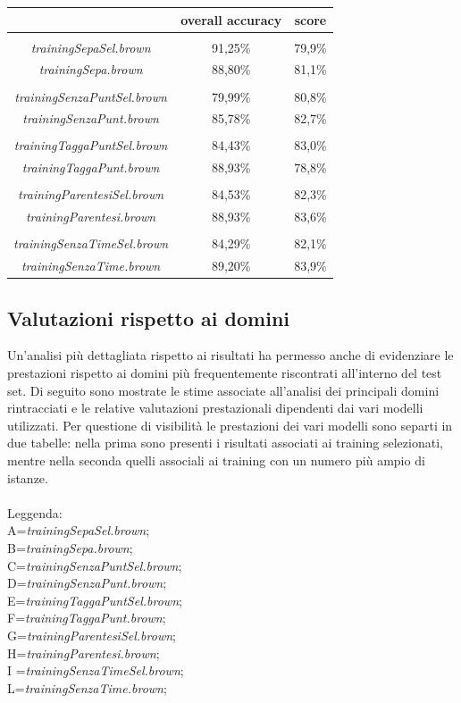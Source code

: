 \documentclass[a4paper]{report}
\begin{document}
\begin{center}
\begin{tabular}{|ccc|}
\hline
 & \textbf{overall accuracy} & \textbf{score}\\
\hline
 & &  \\
\hline
\textit{trainingSepaSel.brown} & 91,25\% & 79,9\% \\
\textit{trainingSepa.brown} & 88,80\% & 81,1\% \\
\hline
 & &  \\
\hline
\textit{trainingSenzaPuntSel.brown} & 79,99\% & 80,8\% \\
\textit{trainingSenzaPunt.brown} & 85,78\% & 82,7\% \\
\hline
 & &  \\
\hline
\textit{trainingTaggaPuntSel.brown} & 84,43\% & 83,0\% \\
\textit{trainingTaggaPunt.brown} & 88,93\% & 78,8\% \\
\hline
 & &  \\
\hline
\textit{trainingParentesiSel.brown} & 84,53\% &  82,3\% \\
\textit{trainingParentesi.brown} & 88,93\% & 83,6\% \\
\hline
 & &  \\
\hline
\textit{trainingSenzaTimeSel.brown} & 84,29\% & 82,1\% \\
\textit{trainingSenzaTime.brown} & 89,20\% & 83,9\% \\
\hline
\end{tabular}
\end{center}
\subsection{Valutazioni rispetto ai domini}
Un'analisi più dettagliata rispetto ai risultati ha permesso anche di evidenziare le prestazioni rispetto ai domini più frequentemente riscontrati all'interno del test set. Di seguito sono mostrate le stime associate all'analisi dei principali domini rintracciati e le relative valutazioni prestazionali dipendenti dai vari modelli utilizzati. Per questione di visibilità le prestazioni dei vari modelli sono separti in due tabelle: nella prima sono presenti i risultati associati ai training selezionati, mentre nella seconda quelli associali ai training con un numero più ampio di istanze.\\ \\
Leggenda:\\
A=\textit{trainingSepaSel.brown};\\
B=\textit{trainingSepa.brown}; \\
C=\textit{trainingSenzaPuntSel.brown}; \\
D=\textit{trainingSenzaPunt.brown}; \\
E=\textit{trainingTaggaPuntSel.brown};\\
F=\textit{trainingTaggaPunt.brown};\\
G=\textit{trainingParentesiSel.brown}; \\
H=\textit{trainingParentesi.brown};\\
I =\textit{trainingSenzaTimeSel.brown}; \\
L=\textit{trainingSenzaTime.brown}; \\
\end{document}

